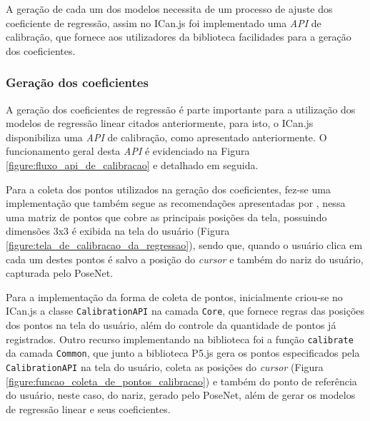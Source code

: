 \par A geração de cada um dos modelos necessita de um processo de ajuste dos coeficiente de regressão, assim no ICan.js foi implementado uma \textit{API} de calibração, que fornece aos utilizadores da biblioteca facilidades para a geração dos coeficientes.


\subsubsection{Geração dos coeficientes}

\par A geração dos coeficientes de regressão é parte importante para a utilização dos modelos de regressão linear citados anteriormente, para isto, o ICan.js disponibiliza uma \textit{API} de calibração, como apresentado anteriormente. O funcionamento geral desta \textit{API} é evidenciado na Figura \ref{figure:fluxo_api_de_calibracao} e detalhado em seguida.


\par Para a coleta dos pontos utilizados na geração dos coeficientes, fez-se uma implementação que também segue as recomendações apresentadas por , nessa uma matriz de pontos que cobre as principais posições da tela, possuindo dimensões 3x3 é exibida na tela do usuário (Figura \ref{figure:tela_de_calibracao_da_regressao}), sendo que, quando o usuário clica em cada um destes pontos é salvo a posição do \textit{cursor} e também do nariz do usuário, capturada pelo PoseNet.


\par Para a implementação da forma de coleta de pontos, inicialmente criou-se no ICan.js a classe \texttt{CalibrationAPI} na camada \texttt{Core}, que fornece regras das posições dos pontos na tela do usuário, além do controle da quantidade de pontos já registrados. Outro recurso implementando na biblioteca foi a função \texttt{calibrate} da camada \texttt{Common}, que junto a biblioteca P5.js gera os pontos especificados pela \texttt{CalibrationAPI} na tela do usuário, coleta as posições do \textit{cursor} (Figura \ref{figure:funcao_coleta_de_pontos_calibracao}) e também do ponto de referência do usuário, neste caso, do nariz, gerado pelo PoseNet, além de gerar os modelos de regressão linear e seus coeficientes.

